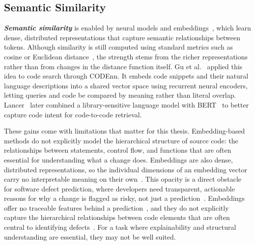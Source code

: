 \documentclass[\main/thesis.tex]{subfiles}
\begin{document}



\subsection{Semantic Similarity}
\label{sec:semantic-similarity}
\textbf{\textit{Semantic similarity}} is enabled by neural models and embeddings~\cite{mikolov2013distributed}, which learn dense, distributed representations that capture semantic relationships between tokens. Although similarity is still computed using standard metrics such as cosine or Euclidean distance~\cite{dokmanic2015euclidean}, the strength stems from the richer representations rather than from changes in the distance function itself. 
Gu et al.~\cite{deepCS} applied this idea to code search through CODEnn. It embeds code snippets and their natural language descriptions into a shared vector space using recurrent neural encoders, letting queries and code be compared by meaning rather than literal overlap. Lancer~\cite{lancer} later combined a library-sensitive language model with BERT~\cite{devlin2019bert} to better capture code intent for code-to-code retrieval.


These gains come with limitations that matter for this thesis. Embedding-based methods do not explicitly model the hierarchical structure of source code: the relationships between statements, control flow, and functions that are often essential for understanding what a change does. Embeddings are also dense, distributed representations, so the individual dimensions of an embedding vector carry no interpretable meaning on their own~\cite{grattan2024need}. This opacity is a direct obstacle for software defect prediction, where developers need transparent, actionable reasons for why a change is flagged as risky, not just a prediction~\cite{ribeiro2016should}. Embeddings offer no traceable features behind a prediction~\cite{allamanis2014learning}, and they do not explicitly capture the hierarchical relationships between code elements that are often central to identifying defects~\cite{allamanis2014learning}. For a task where explainability and structural understanding are essential, they may not be well suited.
\end{document}
